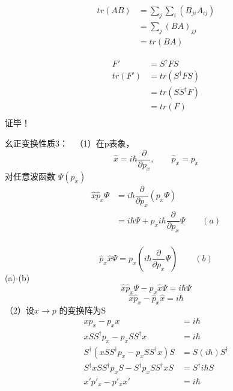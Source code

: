 \begin{frame}     
    \begin{equation*}
        \begin{split}
            tr(AB) &=\sum_{j} \sum_{i} (B_{ji} A_{ij}) \\
            &=\sum_{j} (BA)_{jj} \\
            &=tr(BA)
        \end{split} 
    \end{equation*}

    \begin{equation*}
        \begin{split}
            F'&= S^{\dagger} F S \\
            tr(F')&=tr(S^{\dagger} F S)\\
            &=tr(SS^{\dagger}  F)\\
            &=tr(F)\\
        \end{split} 
    \end{equation*} 
    证毕！
\end{frame}    

\begin{frame} {幺正变换性质3：}
    \例[21、幺正变换不改变物理规律，现已知在 x 表象中的基本对易关系$xp_x-p_x x =i\hbar$， 试求它在p表象中的形式，然后证明这种对易关系不随表象发生变化]{}
    \解 ~（1）在p表象， $$ \hat{x}=i\hbar\dfrac{\partial}{\partial p_x}, \qquad \hat{p}_x=p_x $$
     对任意波函数 $\Psi(p_x)$
    \begin{equation*}
        \begin{split}
            \hat{x}\hat{p}_x\Psi &= i\hbar\dfrac{\partial}{\partial p_x} (p_x \Psi )\\
            &= i\hbar\Psi + p_xi\hbar\dfrac{\partial}{\partial p_x}\Psi \qquad (a)\\
        \end{split} 
    \end{equation*} 
\end{frame}  
\begin{frame} 
    $$\hat{p}_x\hat{x}\Psi = p_x(i\hbar\dfrac{\partial}{\partial p_x}\Psi) \qquad (b)$$
    (a)-(b)
    $$\hat{x}\hat{p}_x\Psi-\hat{p}_x\hat{x}\Psi=i\hbar\Psi$$
    $$\hat{x}\hat{p}_x-\hat{p}_x\hat{x}=i\hbar$$
  （2）设$x \to p$ 的变换阵为S 
    \begin{equation*}
        \begin{split}
            xp_x-p_x x &=i\hbar \\
            xSS^\dagger p_x-p_x SS^\dagger x &=i\hbar \\
            S^\dagger(xSS^\dagger p_x-p_x SS^\dagger x)S &= S (i\hbar) S^\dagger \\
            S^\dagger xSS^\dagger p_xS- S^\dagger p_x SS^\dagger xS &= S^\dagger i\hbar S \\
            x' p'_x- p'_x x' &= i\hbar \\
        \end{split} 
    \end{equation*} 
\end{frame}  

